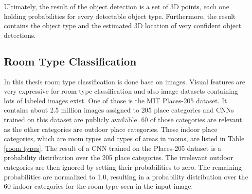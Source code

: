 Ultimately, the result of the object detection is a set of 3D points, each one holding probabilities for every detectable object type. Furthermore, the result contains the object type and the estimated 3D location of very confident object detections. 

\subsection{Room Type Classification} \label{Room Type Classification} %

In this thesis room type classification is done base on images. Visual features are very expressive for room type classification and also image datasets containing lots of labeled images exist. One of those is the MIT Places-205 dataset. It contains about 2.5 million images assigned to 205 place categories and CNNs trained on this dataset are publicly available. 60 of those categories are relevant as the other categories are outdoor place categories. These indoor place categories, which are room types and types of areas in rooms, are listed in Table \ref{room types}. The result of a CNN trained on the Places-205 dataset is a probability distribution over the 205 place categories. The irrelevant outdoor categories are then ignored by setting their probabilities to zero. The remaining probabilities are normalized to 1.0, resulting in a probability distribution over the 60 indoor categories for the room type seen in the input image.

